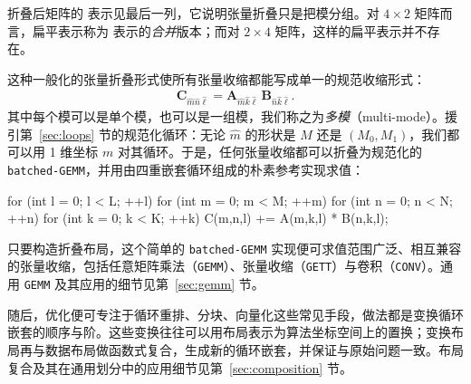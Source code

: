 折叠后矩阵的 \CuTe 表示见最后一列，它说明张量折叠只是把模分组。对 $4 {\times} 2$ 矩阵而言，扁平表示称为 \CuTe 表示的{\em 合并}版本；而对 $2 {\times} 4$ 矩阵，这样的扁平表示并不存在。

这种一般化的张量折叠形式使所有张量收缩都能写成单一的规范收缩形式：
\begin{align}
\mathbf{C}_{\hat{m}\hat{n}\hat{\ell}} = \mathbf{A}_{\hat{m}\hat{k}\hat{\ell}} \, \mathbf{B}_{\hat{n}\hat{k}\hat{\ell}}.
\end{align}
其中每个模可以是单个模，也可以是一组模，我们称之为{\em 多模}（multi-mode）。援引第~\ref{sec:loops} 节的规范化循环：无论 $\hat{m}$ 的形状是 $M$ 还是 $(M_0,M_1)$，我们都可以用 1 维坐标 $m$ 对其循环。于是，任何张量收缩都可以折叠为规范化的 {\tt batched-GEMM}，并用由四重嵌套循环组成的朴素参考实现求值：
\begin{cpp}
for (int l = 0; l < L; ++l)
  for (int m = 0; m < M; ++m)
    for (int n = 0; n < N; ++n)
      for (int k = 0; k < K; ++k)
        C(m,n,l) += A(m,k,l) * B(n,k,l);
\end{cpp}
只要构造折叠布局，这个简单的 {\tt batched-GEMM} 实现便可求值范围广泛、相互兼容的张量收缩，包括任意矩阵乘法（{\tt GEMM}）、张量收缩（{\tt GETT}）与卷积（{\tt CONV}）。通用 {\tt GEMM} 及其应用的细节见第~\ref{sec:gemm} 节。

随后，优化便可专注于循环重排、分块、向量化这些常见手段，做法都是变换循环嵌套的顺序与阶。这些变换往往可以用布局表示为算法坐标空间上的置换；变换布局再与数据布局做函数式复合，生成新的循环嵌套，并保证与原始问题一致。布局复合及其在通用划分中的应用细节见第~\ref{sec:composition} 节。

